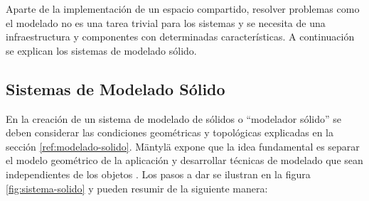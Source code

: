 Aparte de la implementación de un espacio compartido, resolver problemas como el modelado no es una tarea trivial para los sistemas y se necesita de una infraestructura y componentes con determinadas características. A continuación se explican los sistemas de modelado sólido.

\subsection{Sistemas de Modelado Sólido }

En la creación de un sistema de modelado de sólidos o ``modelador sólido'' se deben considerar las condiciones geométricas y topológicas explicadas en la sección \ref{ref:modelado-solido}. Mäntylä expone que la idea fundamental es separar el modelo geométrico de la aplicación y desarrollar técnicas de modelado que sean independientes de los objetos \citep{Mantyla:1988:ISM:60949}. Los pasos a dar se ilustran en la figura \ref{fig:sistema-solido} y pueden resumir de la siguiente manera:


